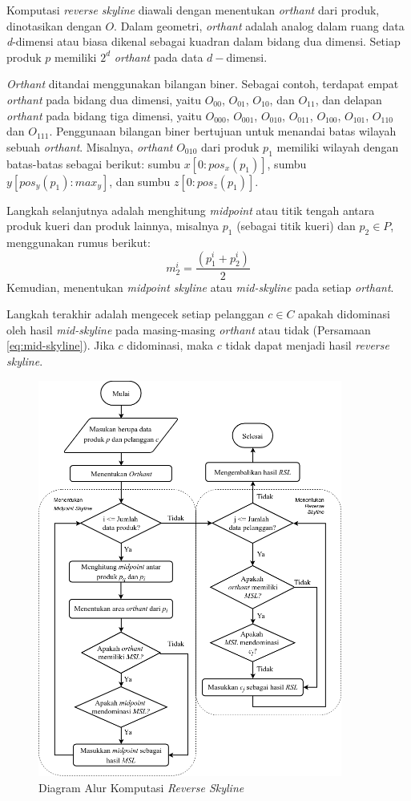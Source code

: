 Komputasi \textit{reverse skyline} diawali dengan menentukan \textit{orthant} dari produk, dinotasikan dengan $O$. Dalam geometri, \textit{orthant} adalah analog dalam ruang data \textit{d}-dimensi atau biasa dikenal sebagai kuadran dalam bidang dua dimensi. Setiap produk $p$ memiliki $2^d$ \textit{orthant} pada data $d-$dimensi. 

\textit{Orthant} ditandai menggunakan bilangan biner. Sebagai contoh, terdapat empat \textit{orthant} pada bidang dua dimensi, yaitu $O_{00}$, $O_{01}$, $O_{10}$, dan $O_{11}$, dan delapan \textit{orthant} pada bidang tiga dimensi, yaitu $O_{000}$, $O_{001}$, $O_{010}$, $O_{011}$, $O_{100}$, $O_{101}$, $O_{110}$ dan $O_{111}$. Penggunaan bilangan biner bertujuan untuk menandai batas wilayah sebuah \textit{orthant}. Misalnya, \textit{orthant} $O_{010}$ dari produk $p_1$ memiliki wilayah dengan batas-batas sebagai berikut: sumbu $x [0:pos_x(p_1)]$, sumbu $y [pos_y(p_1):max_y]$, dan sumbu $z [0:pos_z(p_1)]$.

Langkah selanjutnya adalah menghitung \textit{midpoint} atau titik tengah antara produk kueri dan produk lainnya, misalnya $p_1$ (sebagai titik kueri) dan $p_2 \in P$, menggunakan rumus berikut: 
\begin{equation} \label{eq:midpoint2}
m_2^i = \frac{(p_1^i + p_2^i)}{2}
\end{equation}
Kemudian, menentukan \textit{midpoint skyline} atau \textit{mid-skyline} \cite{mid-skyline} pada setiap \textit{orthant}.

Langkah terakhir adalah mengecek setiap pelanggan $c \in C$ apakah didominasi oleh hasil \textit{mid-skyline} pada masing-masing \textit{orthant} atau tidak (Persamaan \ref{eq:mid-skyline}). Jika $c$ didominasi, maka $c$ tidak dapat menjadi hasil \textit{reverse skyline}.

\begin{figure}[H]
	\centering
	\includegraphics[width=10cm]{assets/img/bab3/flowchart-rsl.png}
	\caption{Diagram Alur Komputasi \textit{Reverse Skyline}}
	\label{fig:flowchart-rsl}
\end{figure}

